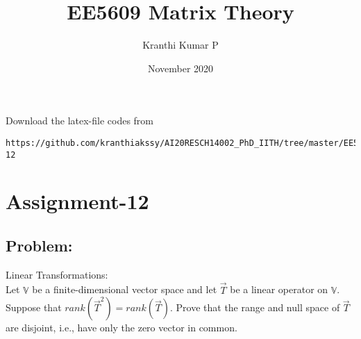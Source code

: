 \documentclass[journal,12pt,twocolumn]{IEEEtran}
\begin{document}
     \def\rightbox#1{\makebox[0in][r]{#1}}
     \def\centbox#1{\makebox[0in]{#1}}
     \def\topbox#1{\raisebox{-\baselineskip}[0in][0in]{#1}}
     \def\midbox#1{\raisebox{-0.5\baselineskip}[0in][0in]{#1}}
\vspace{3cm}
\title{EE5609 Matrix Theory}
\author{Kranthi Kumar P}
\date{November 2020}
\maketitle
\newpage
\bigskip
\renewcommand{\thefigure}{\theenumi}
\renewcommand{\thetable}{\theenumi}

Download the latex-file codes from 
\begin{lstlisting}
https://github.com/kranthiakssy/AI20RESCH14002_PhD_IITH/tree/master/EE5609_Matrix_Theory/Assignment-12
\end{lstlisting}
\section*{Assignment-12}
\subsection*{Problem:}
Linear Transformations:\\
Let $\mathbb{V}$ be a finite-dimensional vector space and let $\vec{T}$ be a linear operator on $\mathbb{V}$. Suppose that $rank (\vec{T}^2) = rank (\vec{T})$. Prove that the range and null space  of $\vec{T}$ are disjoint, i.e., have only the zero vector in common.
\end{document}
